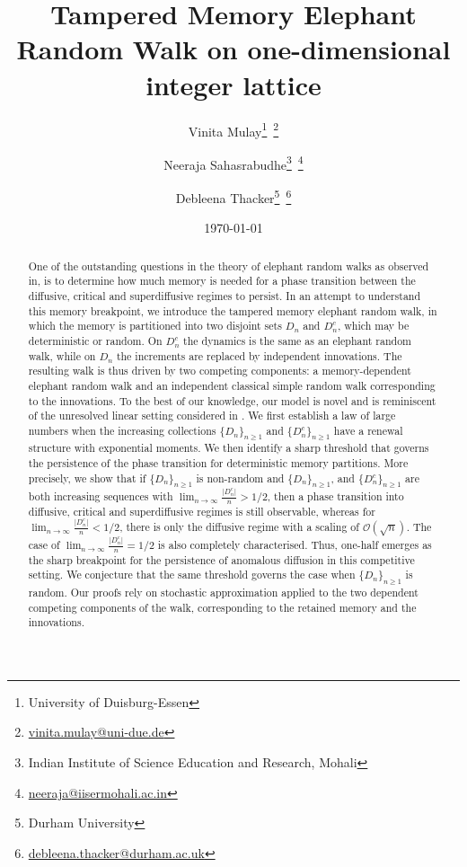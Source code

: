\documentclass{article}
\title{Tampered Memory Elephant Random Walk on one-dimensional integer lattice}
\author{Vinita Mulay\footnote{{University of Duisburg-Essen}}~\footnote{\href{mailto:vinitamulay5@gmail.com}{vinita.mulay@uni-due.de}}
\and 
Neeraja Sahasrabudhe\footnote{{Indian Institute of Science Education and  Research, Mohali}}~\footnote{\href{mailto:neeraja@iisermohali.ac.in}{neeraja@iisermohali.ac.in}}
\and Debleena Thacker\footnote{{Durham University}}~\footnote{\href{mailto:debleena.thacker@durham.ac.uk}{debleena.thacker@durham.ac.uk}}}
\date{\today}
\numberwithin{equation}{section}
\newcommand{\OO}{\mbox{${\mathcal O}$}}
\newcommand{\1}{\mathbf{1}}
\newcommand{\0}{\mathbf{0}}
\begin{document}
\maketitle
\begin{abstract} 
One of the outstanding questions in the theory of elephant random walks as observed in\cite{gut2023elephant}, is to determine how much memory is needed for a phase transition between the diffusive, critical and superdiffusive regimes to persist. In an attempt to understand this memory breakpoint, we introduce the tampered memory elephant random walk, in which the memory is partitioned into two disjoint sets $D_n$ and $D_n^c$, which may be deterministic or random. On $D_n^c$ the dynamics is the same as an elephant random walk, while on $D_n$ the increments are replaced by independent innovations. The resulting walk is thus driven by two competing components: a memory-dependent elephant random walk and an independent classical simple random walk corresponding to the innovations. To the best of our knowledge, our model is novel and is reminiscent of the unresolved linear setting considered in \cite{Ro_Ta_Ta_2025}. We first establish a law of large numbers when the increasing collections $\{D_n\}_{n \ge 1}$ and $\{D^c_n\}_{n \ge 1}$ have a renewal structure with exponential moments. We then identify a sharp threshold that governs the persistence of the phase transition for deterministic memory partitions. More precisely, we show that if $\{D_n\}_{n \ge 1}$ is non-random and $\{D_n\}_{n \ge 1}$, and $\{D^c_n\}_{n \ge 1}$ are both increasing sequences with $\lim_{n \to \infty} \frac{\lvert D^c_n\rvert}{n} >1/2$, then a phase transition into diffusive, critical and superdiffusive regimes is still observable, whereas for $\lim_{n \to \infty} \frac{\lvert D^c_n \rvert}{n}<1/2$, there is only the diffusive regime with a scaling of $\OO(\sqrt{n})$. The case of $\lim_{n\to \infty}\frac{\lvert D^c_n \rvert}{n}=1/2$ is also completely characterised. Thus, one-half emerges as the sharp breakpoint for the persistence of anomalous diffusion in this competitive setting. We conjecture that the same threshold governs the case when $\{D_n\}_{n \ge 1}$ is random. Our proofs rely on stochastic approximation applied to the two dependent competing components of the walk, corresponding to the retained memory and the innovations. 


\end{abstract}
\end{document}
